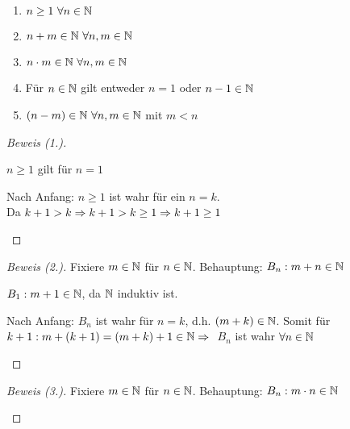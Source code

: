 \begin{satz}
    \label{satz:n-eigenschaften}
    \theoremescape
    \begin{enumerate}
        \item $n\geq 1~\forall n\in\mathbb{N}$
        \item $n+m\in\mathbb{N}~\forall n,m\in\mathbb{N}$
        \item $n\cdot m\in\mathbb{N}~\forall n,m\in\mathbb{N}$
        \item Für $n\in\mathbb{N}$ gilt entweder $n=1$ oder $n-1\in\mathbb{N}$
        \item $(n-m) \in \mathbb{N}~\forall n,m\in\mathbb{N}$ mit $m<n$
    \end{enumerate}
    \begin{proof}[Beweis (1.)]
        ~\\
        \begin{induktionsanfang}
            $n\geq 1$ gilt für $n=1$
        \end{induktionsanfang}
        \begin{induktionsschritt}
            Nach Anfang: $n\geq 1$ ist wahr für ein $n=k$.\\
            Da $k+1>k\Rightarrow{} k+1>k\geq 1 \Rightarrow{} k+1\geq 1$\qedhere
        \end{induktionsschritt}
    \end{proof}
    \begin{proof}[Beweis (2.)]
        Fixiere $m\in\mathbb{N}$ für $n\in\mathbb{N}$. Behauptung: $B_n: m+n\in \mathbb{N}$\\
        \begin{induktionsanfang}
            $B_1: m+1 \in \mathbb{N}$, da $\mathbb{N}$ induktiv ist.
        \end{induktionsanfang}
        \begin{induktionsschritt}
            Nach Anfang: $B_n$ ist wahr für $n=k$, d.h. $(m+k)\in\mathbb{N}$. Somit für $k+1: m+(k+1) = (m+k)+1\in\mathbb{N} \Rightarrow{}$ $B_n$ ist wahr $\forall n\in\mathbb{N}$\qedhere
        \end{induktionsschritt}
    \end{proof}
    \begin{proof}[Beweis (3.)]
        Fixiere $m\in\mathbb{N}$ für $n\in\mathbb{N}$. Behauptung: $B_n: m\cdot n\in \mathbb{N}$\\
        \begin{induktionsanfang}

\end{induktionsanfang}
\end{proof}
\end{satz}
